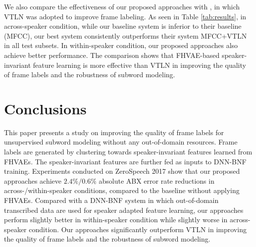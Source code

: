 \documentclass[a4paper]{article}
\begin{document}
We also compare the effectiveness of our proposed approaches with  \cite{chen2017multilingual}, in which VTLN was adopted to improve frame labeling. As seen in Table \ref{tab:results}, in across-speaker  condition, while our baseline system is inferior to their baseline (MFCC), our best system consistently  outperforms their system MFCC+VTLN  in all test subsets. 
In within-speaker condition, our proposed approaches also achieve better performance.
The comparison shows that  FHVAE-based speaker-invariant feature learning is more effective than VTLN in improving the quality of frame labels and the robustness of subword modeling.
\section{Conclusions}

This paper presents a study on improving the quality of frame labels for unsupervised subword modeling without any out-of-domain resources.
Frame labels are generated by clustering towards speaker-invariant features learned from FHVAEs.
The speaker-invariant features are further fed as inputs to DNN-BNF training.
Experiments conducted on ZeroSpeech 2017 show that our proposed approaches achieve $2.4\%/0.6\%$ absolute  ABX error rate reductions in across-/within-speaker conditions, compared to the baseline without applying FHVAEs.
Compared with a DNN-BNF system in which out-of-domain transcribed data are used for speaker adapted feature learning, our approaches perform slightly better in within-speaker condition while slightly worse in across-speaker condition.
Our approaches significantly outperform VTLN in improving the quality of frame labels and the robustness of subword modeling.
\end{document}
